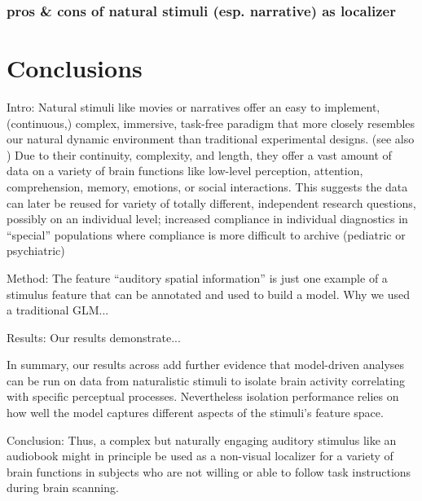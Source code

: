 \documentclass[english]{article}
\begin{document}
\subsubsection{pros \& cons of natural stimuli (esp. narrative) as localizer}





\section{Conclusions}


Intro: Natural stimuli like movies \citep{hasson2008neurocinematics,
sonkusare2019naturalistic} or narratives \citep{honey2012not,
lerner2011topographic, silbert2014coupled} offer an easy to implement,
(continuous,) complex, immersive, task-free paradigm that more closely resembles
our natural dynamic environment than traditional experimental designs.
(see also \citep{sonkusare2019naturalistic, eickhoff2020towards,hamilton2018revolution})
Due to their continuity, complexity, and length, they offer a vast amount of
data on a variety of brain functions like low-level perception, attention,
comprehension, memory, emotions, or social interactions. This suggests the data
can later be reused for variety of totally different, independent research
questions, possibly on an individual level; increased compliance in individual
diagnostics in ``special'' populations where compliance is more difficult to
archive (pediatric or psychiatric)

Method: The feature ``auditory spatial information'' is just one example of a
stimulus feature that can be annotated and used to build a model.
Why we used a traditional GLM...

Results: Our results demonstrate...

In summary, our results across add further evidence that model-driven analyses
can be run on data from naturalistic stimuli to isolate brain activity
correlating with specific perceptual processes.
Nevertheless isolation performance relies on how well the model captures
different aspects of the stimuli's feature space.

Conclusion: Thus, a complex but naturally engaging auditory stimulus like an
audiobook might in principle be used as a non-visual localizer for a variety of
brain functions in subjects who are not willing or able to follow task
instructions during brain scanning.
\end{document}

